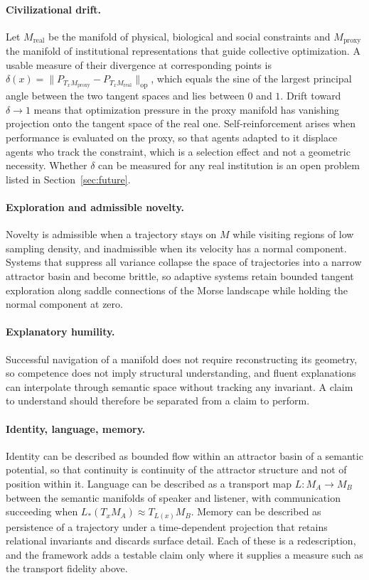\documentclass[11pt,a4paper]{article}
\theoremstyle{definition}
\theoremstyle{remark}
\begin{document}
\paragraph{Civilizational drift.}
Let $M_{\mathrm{real}}$ be the manifold of physical, biological and social
constraints and $M_{\mathrm{proxy}}$ the manifold of institutional
representations that guide collective optimization. A usable measure of their
divergence at corresponding points is
$\delta(x)=\|P_{T_xM_{\mathrm{proxy}}}-P_{T_xM_{\mathrm{real}}}\|_{\mathrm{op}}$,
which equals the sine of the largest principal angle between the two tangent
spaces and lies between $0$ and $1$. Drift toward $\delta\to1$ means that
optimization pressure in the proxy manifold has vanishing projection onto the
tangent space of the real one. Self-reinforcement arises when performance is
evaluated on the proxy, so that agents adapted to it displace agents who track
the constraint, which is a selection effect and not a geometric necessity.
Whether $\delta$ can be measured for any real institution is an open problem
listed in Section~\ref{sec:future}.

\paragraph{Exploration and admissible novelty.}
Novelty is admissible when a trajectory stays on $M$ while visiting regions of
low sampling density, and inadmissible when its velocity has a normal
component. Systems that suppress all variance collapse the space of
trajectories into a narrow attractor basin and become brittle, so adaptive
systems retain bounded tangent exploration along saddle connections of the
Morse landscape while holding the normal component at zero.

\paragraph{Explanatory humility.}
Successful navigation of a manifold does not require reconstructing its
geometry, so competence does not imply structural understanding, and fluent
explanations can interpolate through semantic space without tracking any
invariant. A claim to understand should therefore be separated from a
claim to perform.

\paragraph{Identity, language, memory.}
Identity can be described as bounded flow within an attractor basin of a
semantic potential, so that continuity is continuity of the attractor
structure and not of position within it. Language can be described as a
transport map $L:M_A\to M_B$ between the semantic manifolds of speaker and
listener, with communication succeeding when $L_\ast(T_xM_A)\approx T_{L(x)}M_B$.
Memory can be described as persistence of a trajectory under a time-dependent
projection that retains relational invariants and discards surface detail.
Each of these is a redescription, and the framework adds a testable claim
only where it supplies a measure such as the transport fidelity above.
\end{document}
